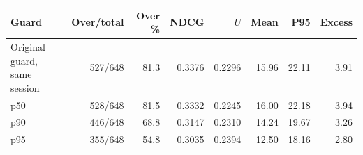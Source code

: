 \begin{tabular}{lrrrrrrr}
\toprule
Guard & Over/total & Over \% & NDCG & $U$ & Mean & P95 & Excess \\
\midrule
Original guard, same session & 527/648 & 81.3 & 0.3376 & 0.2296 & 15.96 & 22.11 & 3.91 \\
p50 & 528/648 & 81.5 & 0.3332 & 0.2245 & 16.00 & 22.18 & 3.94 \\
p90 & 446/648 & 68.8 & 0.3147 & 0.2310 & 14.24 & 19.67 & 3.26 \\
p95 & 355/648 & 54.8 & 0.3035 & 0.2394 & 12.50 & 18.16 & 2.80 \\
\bottomrule
\end{tabular}
